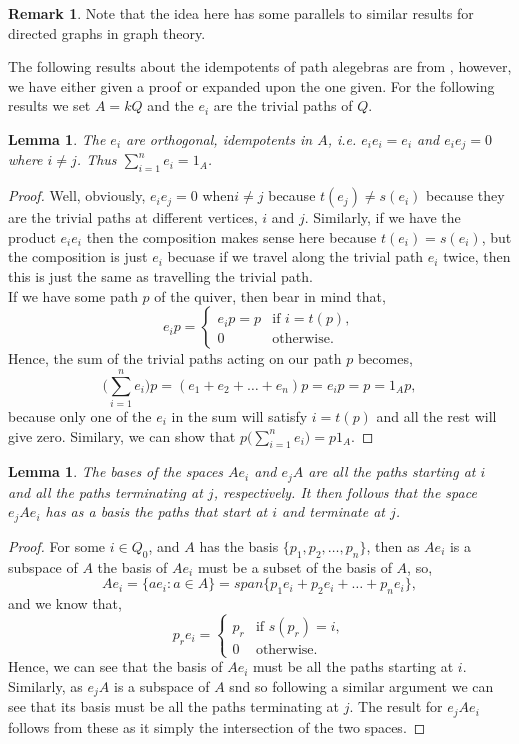 \documentclass[11.5pt, twoside, a4paper, titlepage]{report}
\providecommand{\equ}[0]{\begin{equation*}}
\providecommand{\eequ}[0] {\end{equation*}}
\theoremstyle{definition}
\newtheorem{rem}[mydef]{Remark}
\theoremstyle{plain}
\newtheorem{lem}[mydef]{Lemma}
\begin{document}
\begin{rem}
Note that the idea here has some parallels to similar results for directed graphs in graph theory.
\end{rem}

The following results about the idempotents of path alegebras are from \cite{CB2}, however, we have either given a proof or expanded upon the one given. For the following results we set $A=kQ$ and the $e_i$ are the trivial paths of $Q$.

\begin{lem} 
The $e_i$ are orthogonal, idempotents in $A$, i.e. $e_ie_i=e_i$ and $e_ie_j=0$ where $i\neq j$. Thus $\sum_{i=1}^{n}{e_i}=1_{A}$.
\end{lem}
\begin{proof}
Well, obviously, $e_ie_j=0$ when$i\neq j$ because $t(e_j)\neq s(e_i)$ because they are the trivial paths at different vertices, $i$ and $j$. Similarly, if we have the product $e_ie_i$ then the composition makes sense here because $t(e_i)=s(e_i)$, but the composition is just $e_i$ becuase if we travel along the trivial path $e_i$ twice, then this is just the same as travelling the trivial path. \\
If we have some path $p$ of the quiver, then bear in mind that,
\equ
e_ip=
\begin{cases}
e_ip=p & \text{if } i=t(p),\\
0 & \text{otherwise.}
\end{cases}
\eequ
Hence, the sum of the trivial paths acting on our path $p$ becomes, 
\equ
\big(\sum^{n}_{i=1}{e_i}\big)p=(e_1+e_2+\dots +e_n)p=e_ip=p=1_Ap,
\eequ
because only one of the $e_i$ in the sum will satisfy $i=t(p)$ and all the rest will give zero. Similary, we can show that $p\big(\sum^{n}_{i=1}{e_i}\big)=p1_A$.
\end{proof}

\begin{lem} \label{idempotentspaceslem}
The bases of the spaces $Ae_i$ and $e_jA$ are all the paths starting at $i$ and all the paths terminating at $j$, respectively. It then follows that the space $e_jAe_i$ has as a basis the paths that start at $i$ and terminate at $j$.
\end{lem}
\begin{proof}
For some $i\in Q_0$, and $A$ has the basis $\{p_1, p_2, \dots, p_n\}$, then as $Ae_i$ is a subspace of $A$ the basis of $Ae_i$ must be a subset of the basis of $A$, so, 
\equ
Ae_i=\{ae_i:a\in A\}=span\{p_1e_i+p_2e_i+\dots+p_ne_i\},
\eequ
and we know that,
\equ
p_re_i=
\begin{cases}
p_r & \text{if } s(p_r)=i,\\
0 & \text{otherwise}.
\end{cases}
\eequ
Hence, we can see that the basis of $Ae_i$ must be all the paths starting at $i$. Similarly, as $e_jA$ is a subspace of $A$ snd so following a similar argument we can see that its basis must be all the paths terminating at $j$. The result for $e_jAe_i$ follows from these as it simply the intersection of the two spaces.
\end{proof}
\end{document}
